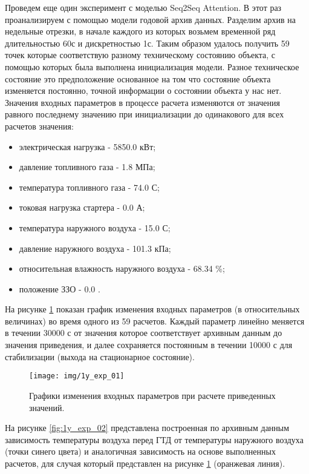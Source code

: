\documentclass[12pt,a4paper]{article}
\begin{document}
Проведем еще один эксперимент с моделью Seq2Seq Attention. В этот раз проанализируем с помощью модели годовой архив данных. Разделим архив на недельные отрезки, в начале каждого из которых возьмем временной ряд длительностью 60с и дискретностью 1с. Таким образом удалось получить 59 точек которые соответствую разному техническому состоянию объекта, с помощью которых была выполнена инициализация модели. Разное техническое состояние это предположение основанное на том что состояние объекта изменяется постоянно, точной информации о состоянии объекта у нас нет. Значения входных параметров в процессе расчета изменяются от значения равного последнему значению при инициализации до одинакового для всех расчетов значения:

\begin{itemize}
	\item электрическая нагрузка - 5850.0 кВт;
	\item давление топливного газа - 1.8 МПа;
	\item температура топливного газа - 74.0 \degree С;
	\item токовая нагрузка стартера - 0.0 А;
	\item температура наружного воздуха - 15.0 \degree С;
	\item давление наружного воздуха - 101.3 кПа;
	\item относительная влажность наружного воздуха - 68.34 \%;
	\item положение ЗЗО - 0.0 \degree.
\end{itemize}

На рисунке \ref{fig:1y_exp_01} показан график изменения входных параметров (в относительных величинах) во время одного из 59 расчетов. Каждый параметр линейно меняется в течении 30000 с от значения которое соответствует архивным данным до значения приведения, и далее сохраняется постоянным в течении 10000 с для стабилизации (выхода на стационарное состояние). 

\begin{figure}[htbp]
	\centering\texttt{[image: img/1y\_exp\_01]}
	\caption{Графики изменения входных параметров при расчете приведенных значений.}
	\label{fig:1y_exp_01}
\end{figure}


На рисунке \ref{fig:1y_exp_02} представлена построенная по архивным данным зависимость температуры воздуха перед ГТД от температуры наружного воздуха (точки синего цвета) и аналогичная зависимость на основе выполненных расчетов, для случая который представлен на рисунке \ref{fig:1y_exp_01} (оранжевая линия).
\end{document}
